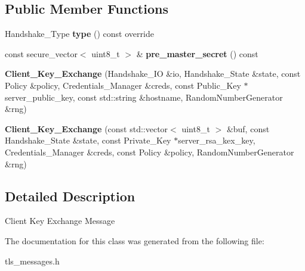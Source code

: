 \subsection*{Public Member Functions}
\begin{DoxyCompactItemize}
\item 
\mbox{\label{class_botan_1_1_t_l_s_1_1_client___key___exchange_a0111fef3d825607f5025d68a895fceab}} 
Handshake\+\_\+\+Type {\bfseries type} () const override
\item 
\mbox{\label{class_botan_1_1_t_l_s_1_1_client___key___exchange_a832f8169b1894c78ba5a455fb1a9c32f}} 
const secure\+\_\+vector$<$ uint8\+\_\+t $>$ \& {\bfseries pre\+\_\+master\+\_\+secret} () const
\item 
\mbox{\label{class_botan_1_1_t_l_s_1_1_client___key___exchange_a038639f04d2cbb32f2fa807be5818d52}} 
{\bfseries Client\+\_\+\+Key\+\_\+\+Exchange} (Handshake\+\_\+\+IO \&io, Handshake\+\_\+\+State \&state, const Policy \&policy, Credentials\+\_\+\+Manager \&creds, const Public\+\_\+\+Key $\ast$server\+\_\+public\+\_\+key, const std\+::string \&hostname, Random\+Number\+Generator \&rng)
\item 
\mbox{\label{class_botan_1_1_t_l_s_1_1_client___key___exchange_a3c0bb659d3069c78362c5f11c151765a}} 
{\bfseries Client\+\_\+\+Key\+\_\+\+Exchange} (const std\+::vector$<$ uint8\+\_\+t $>$ \&buf, const Handshake\+\_\+\+State \&state, const Private\+\_\+\+Key $\ast$server\+\_\+rsa\+\_\+kex\+\_\+key, Credentials\+\_\+\+Manager \&creds, const Policy \&policy, Random\+Number\+Generator \&rng)
\end{DoxyCompactItemize}


\subsection{Detailed Description}
Client Key Exchange Message 

The documentation for this class was generated from the following file\+:\begin{DoxyCompactItemize}
\item 
tls\+\_\+messages.\+h\end{DoxyCompactItemize}
